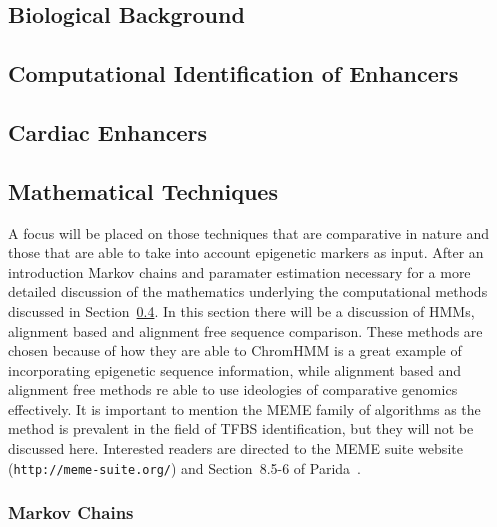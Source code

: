 \documentclass[12pt,a4paper]{article}
\begin{document}
        \subsection{Biological Background}
        
        \subsection{Computational Identification of Enhancers}
        \label{sSec:computational}
         
        \subsection{Cardiac Enhancers}
        
        \subsection{Mathematical Techniques}
        \label{sSec:mathematical}
        A focus will be placed on those techniques that are comparative in nature and those that are able to take into account epigenetic markers as input. After an introduction Markov chains and paramater estimation necessary for a more detailed discussion of the mathematics underlying the computational methods discussed in Section~\ref{sSec:mathematical}. In this section there will be a discussion of HMMs, alignment based and alignment free sequence comparison. These methods are chosen because of how they are able to ChromHMM is a great example of incorporating epigenetic sequence information, while alignment based and alignment free methods re able to use ideologies of comparative genomics effectively. It is important to mention the MEME family of algorithms as the method is prevalent in the field of TFBS identification, but they will not be discussed here.%
        Interested readers are directed to the MEME suite website (\texttt{http://meme-suite.org/}) and Section~8.5-6 of Parida~\cite{parida2007pattern}. 

            

            \subsubsection{Markov Chains}
            
            
\end{document}
